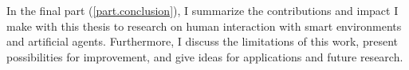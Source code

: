 In the final part (\cref{part.conclusion}), I summarize the contributions and impact I make with this thesis to research on human interaction with \glspl{smart environment} and \glspl{artificial agent}.
Furthermore, I discuss the limitations of this work, present possibilities for improvement, and give ideas for applications and future research.
